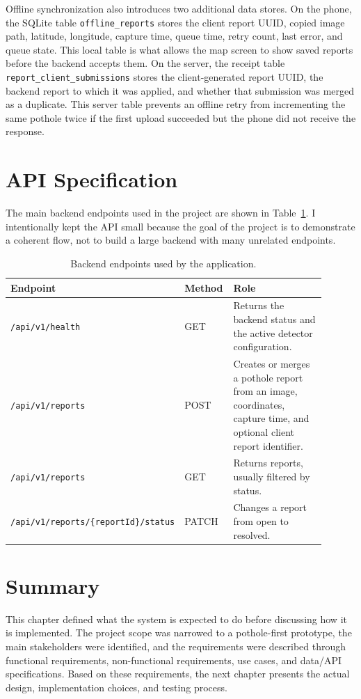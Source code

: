 Offline synchronization also introduces two additional data stores. On the phone, the SQLite table \texttt{offline\_\allowbreak reports} stores the client report UUID, copied image path, latitude, longitude, capture time, queue time, retry count, last error, and queue state. This local table is what allows the map screen to show saved reports before the backend accepts them. On the server, the receipt table \texttt{report\_\allowbreak client\_\allowbreak submissions} stores the client-generated report UUID, the backend report to which it was applied, and whether that submission was merged as a duplicate. This server table prevents an offline retry from incrementing the same pothole twice if the first upload succeeded but the phone did not receive the response.

\section{API Specification}

The main backend endpoints used in the project are shown in Table~\ref{tab:api_endpoints}. I intentionally kept the API small because the goal of the project is to demonstrate a coherent flow, not to build a large backend with many unrelated endpoints.

\begin{table}[htbp]
\centering
\begin{tabular}{>{\raggedright\arraybackslash}p{0.24\linewidth} >{\raggedright\arraybackslash}p{0.16\linewidth} >{\raggedright\arraybackslash}p{0.50\linewidth}}
\toprule
\textbf{Endpoint} & \textbf{Method} & \textbf{Role} \\
\midrule
\texttt{/api/v1/health} & GET & Returns the backend status and the active detector configuration. \\
\texttt{/api/v1/reports} & POST & Creates or merges a pothole report from an image, coordinates, capture time, and optional client report identifier. \\
\texttt{/api/v1/reports} & GET & Returns reports, usually filtered by status. \\
\texttt{/api/v1/reports/\allowbreak\{reportId\}/status} & PATCH & Changes a report from open to resolved. \\
\bottomrule
\end{tabular}
\caption{Backend endpoints used by the application.}
\label{tab:api_endpoints}
\end{table}

\section{Summary}

This chapter defined what the system is expected to do before discussing how it is implemented. The project scope was narrowed to a pothole-first prototype, the main stakeholders were identified, and the requirements were described through functional requirements, non-functional requirements, use cases, and data/API specifications. Based on these requirements, the next chapter presents the actual design, implementation choices, and testing process.
